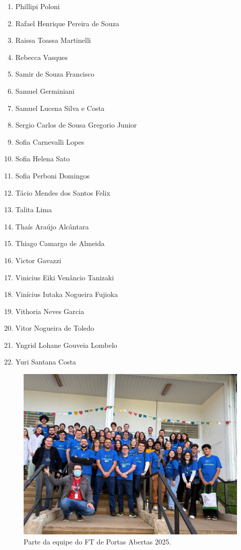\documentclass[
  letterpaper,
  DIV=11,
  numbers=noendperiod]{scrreprt}
\begin{document}
\begin{enumerate}
\item
  Phillipi Poloni
\item
  Rafael Henrique Pereira de Souza
\item
  Raissa Toassa Martinelli
\item
  Rebecca Vasques
\item
  Samir de Souza Francisco
\item
  Samuel Germiniani
\item
  Samuel Lucena Silva e Costa
\item
  Sergio Carlos de Sousa Gregorio Junior
\item
  Sofia Carnevalli Lopes
\item
  Sofia Helena Sato
\item
  Sofia Perboni Domingos
\item
  Tácio Mendes dos Santos Felix
\item
  Talita Lima
\item
  Thaís Araújo Alcântara
\item
  Thiago Camargo de Almeida
\item
  Victor Gavazzi
\item
  Vinicius Eiki Venâncio Tanizaki
\item
  Vinícius Iutaka Nogueira Fujioka
\item
  Vithoria Neves Garcia
\item
  Vitor Nogueira de Toledo
\item
  Yngrid Lohane Gouveia Lombelo
\item
  Yuri Santana Costa
\end{enumerate}

\begin{figure}[H]

{\centering \includegraphics[width=0.8\linewidth,height=\textheight,keepaspectratio]{agradecimentos/foto-equipe.jpg}

}

\caption{Parte da equipe do FT de Portas Abertas 2025.}

\end{figure}%
\end{document}
